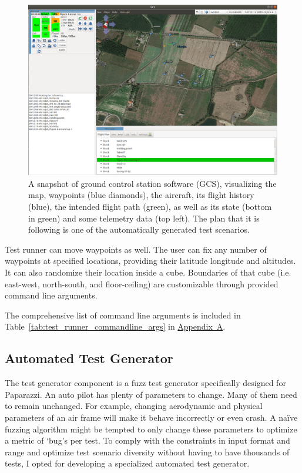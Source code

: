 \begin{figure}
    \centering
    \includegraphics[width=\textwidth]{4_files/GCS.png}
    \caption{A snapshot of ground control station software (GCS), visualizing the map, waypoints (blue diamonds), the aircraft, its flight history (blue), the intended flight path (green), as well as its state (bottom in green) and some telemetry data (top left). The plan that it is following is one of the automatically generated test scenarios.}
    \label{fig:paparazzi_gcs}
\end{figure}

Test runner can move waypoints as well. The user can fix any number of waypoints at specified locations, providing their latitude longitude and altitudes. It can also randomize their location inside a cube. Boundaries of that cube (i.e. east-west, north-south, and floor-ceiling) are customizable through provided command line arguments.

The comprehensive list of command line arguments is included in Table~\ref{tab:test_runner_commandline_args} in \hyperref[appendixa]{Appendix~A}.


\subsection{Automated Test Generator}
The test generator component is a fuzz test generator specifically designed for Paparazzi. An auto pilot has plenty of parameters to change. Many of them need to remain unchanged. For example, changing aerodynamic and physical parameters of an air frame will make it behave incorrectly or even crash. A naïve fuzzing algorithm might be tempted to only change these parameters to optimize a metric of `bug's per test. To comply with the constraints in input format and range and optimize test scenario diversity without having to have thousands of tests, I opted for developing a specialized automated test generator. 

